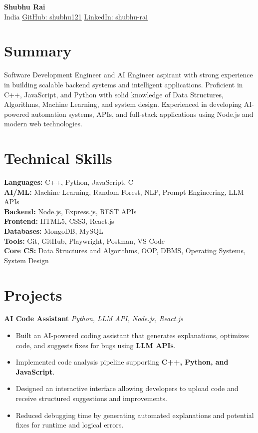 \documentclass[a4paper,9pt]{article}
\begin{document}
\linespread{1.05}

\begin{center}
    {\LARGE \textbf{Shubhu Rai}}\\[2pt]
    India \quad
    \href{https://github.com/shubhu121}{GitHub: shubhu121} \quad
    \href{https://www.linkedin.com/in/shubhu-rai-09340a367/}{LinkedIn: shubhu-rai}
\end{center}

\section*{Summary}
Software Development Engineer and AI Engineer aspirant with strong experience in building scalable backend systems and intelligent applications. 
Proficient in C++, JavaScript, and Python with solid knowledge of Data Structures, Algorithms, Machine Learning, and system design. 
Experienced in developing AI-powered automation systems, APIs, and full-stack applications using Node.js and modern web technologies.

\section*{Technical Skills}

\textbf{Languages:} C++, Python, JavaScript, C \\
\textbf{AI/ML:} Machine Learning, Random Forest, NLP, Prompt Engineering, LLM APIs \\
\textbf{Backend:} Node.js, Express.js, REST APIs \\
\textbf{Frontend:} HTML5, CSS3, React.js \\
\textbf{Databases:} MongoDB, MySQL \\
\textbf{Tools:} Git, GitHub, Playwright, Postman, VS Code \\
\textbf{Core CS:} Data Structures and Algorithms, OOP, DBMS, Operating Systems, System Design

\section*{Projects}

\textbf{AI Code Assistant}
\hfill \textit{Python, LLM API, Node.js, React.js}
\begin{itemize}[leftmargin=12pt, itemsep=1pt]
\item Built an AI-powered coding assistant that generates explanations, optimizes code, and suggests fixes for bugs using \textbf{LLM APIs}.
\item Implemented code analysis pipeline supporting \textbf{C++, Python, and JavaScript}.
\item Designed an interactive interface allowing developers to upload code and receive structured suggestions and improvements.
\item Reduced debugging time by generating automated explanations and potential fixes for runtime and logical errors.
\end{itemize}
\end{document}
